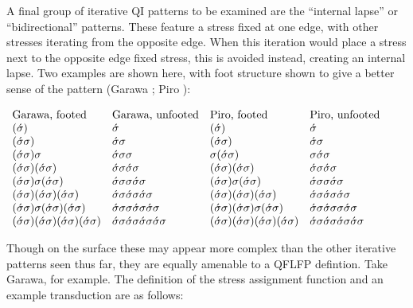\documentclass[12pt]{article}
\newcommand{\sig}{\sigma}
\newcommand{\ass}{\acute{\sig}}
\newcommand{\tm}{\textnormal}
\newcommand{\tr}{\ass\sig}
\begin{document}
A final group of iterative QI patterns to be examined are the ``internal lapse'' or ``bidirectional'' patterns. These feature a stress fixed at one edge, with other stresses iterating from the opposite edge. When this iteration would place a stress next to the opposite edge fixed stress, this is avoided instead, creating an internal lapse. Two examples are shown here, with foot structure shown to give a better sense of the pattern (Garawa \citep{furby74}; Piro \citep{matteson65}):

 \begin{exe}
 \item	$\begin{array}[t]{llll}
  	\tm{Garawa, footed}   & \tm{Garawa, unfooted}   &   \tm{Piro, footed}     & \tm{Piro, unfooted}       \\
  	(\ass)                & \ass                    &   (\ass)                & \ass                \\
  	(\tr)                 & \tr                     &   (\tr)                 & \tr                 \\
  	(\tr)\sig             & \tr\sig                 &   \sig(\tr)             & \sig\tr             \\
  	(\tr)(\tr)            & \tr\tr                  &   (\tr)(\tr)            & \tr\tr              \\
  	(\tr)\sig(\tr)        & \tr\sig\tr              &   (\tr)\sig(\tr)        & \tr\sig\tr          \\
  	(\tr)(\tr)(\tr)       & \tr\tr\tr               &   (\tr)(\tr)(\tr)       & \tr\tr\tr           \\
  	(\tr)\sig(\tr)(\tr)   & \tr\sig\tr\tr           &   (\tr)(\tr)\sig(\tr)   & \tr\tr\sig\tr       \\
    (\tr)(\tr)(\tr)(\tr)  & \tr\tr\tr\tr            &   (\tr)(\tr)(\tr)(\tr)  & \tr\tr\tr\tr
  	
 	\end{array}$
 	\label{bidirect}
\end{exe}

\noindent
Though on the surface these may appear more complex than the other iterative patterns seen thus far, they are equally amenable to a QFLFP defintion. Take Garawa, for example. The definition of the stress assignment function and an example transduction are as follows:
\end{document}
